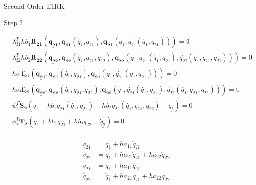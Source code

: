 \documentclass{beamer}
\begin{document}
\begin{frame}[allowframebreaks]{Second Order DIRK}

\tiny{
  \begin{block}{Step 2}
    \begin{minipage}{1.0\textwidth}
      \begin{minipage}{0.7\textwidth}
        \begin{equation}\nonumber
          \begin{split}
            &\lambda_{21}^T h b_1 \mathbf{R_{21}}\left(\underline{\mathbf{\ddot{q}_{21}}},\mathbf{\dot{q}_{21}}(\dot{q_1},\ddot{q_{21}}),\mathbf{{q}_{21}}({q_1},\dot{q_{21}}(\dot{q_1},\ddot{q_{21}}))\right) = 0 \\
            &\lambda_{22}^T h b_2 \mathbf{R_{22}}\left(\underline{\mathbf{\ddot{q}_{22}}},\mathbf{\dot{q}_{22}}(\dot{q_1},\ddot{q_{21}},\ddot{q_{22}}),\mathbf{{q}_{22}}({q_1},\dot{q_{21}}(\dot{q_1},\ddot{q_{21}}),\dot{q_{22}}(\dot{q_1},\ddot{q_{21}},\ddot{q_{22}}))\right) = 0 \\
            &h b_1 \mathbf{f_{21}}\left(\underline{\mathbf{\ddot{q}_{21}}},\mathbf{\dot{q}_{21}}(\dot{q_1},\ddot{q_{21}}),\mathbf{{q}_{21}}({q_1},\dot{q_{21}}(q_1,\ddot{q_{21}}))\right) = 0 \\
            &h b_2 \mathbf{f_{22}}\left(\underline{\mathbf{\ddot{q}_{22}}},\mathbf{\dot{q}_{22}}(\dot{q_1},\ddot{q_{21}},\ddot{q_{22}}),\mathbf{{q}_{22}}({q_1},\dot{q_{21}}(\dot{q_1},\ddot{q_{21}}),\dot{q_{22}}(\dot{q_1},\ddot{q_{21}},\ddot{q_{22}}))\right) = 0 \\
            &\psi_2^T \mathbf{S_2}\left(q_1 + h b_1 \dot{q}_{21}(\dot{q_1},\ddot{q_{21}}) +  h b_2 \dot{q}_{22} (\dot{q_1},\ddot{q_{21}},\ddot{q_{22}}) - \underline{q_2} \right) = 0\\
            &\phi_2^T \mathbf{T_2}\left(\dot{q}_1 + h b_1 \ddot{q}_{21} +  h b_2 \ddot{q}_{22} - \underline{\dot{q}_2} \right) = 0\\
          \end{split}
        \end{equation}
      \end{minipage}
      \begin{minipage}{0.3\textwidth}
        \begin{equation}\nonumber
          \begin{split}
            q_{21} &= q_1 + h a_{11} \dot{q}_{21} \\
            q_{22} &= q_1 + h a_{21} \dot{q}_{21} + h a_{22} \dot{q}_{22} \\
            \dot{q}_{21} &= \dot{q}_1 + h a_{11} \ddot{q}_{21} \\
            \dot{q}_{22} &= \dot{q}_1 + h a_{21} \ddot{q}_{21} + h a_{22} \ddot{q}_{22} \\
          \end{split}
        \end{equation}
      \end{minipage}
    \end{minipage}
  \end{block}

}
\end{frame}
\end{document}
